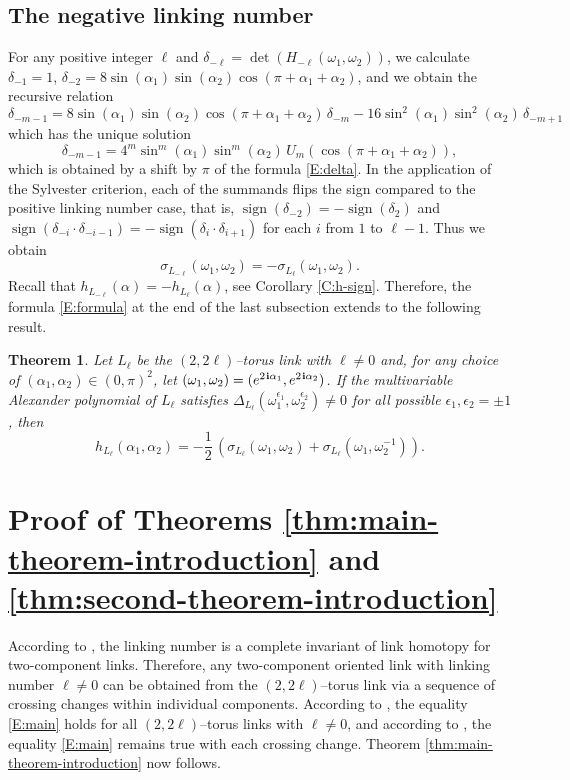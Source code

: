 \documentclass[11pt,reqno]{amsart}
\newtheorem{theorem}{Theorem}[section]
\theoremstyle{definition}
\renewcommand{\i}{\mspace{1.5mu}\mathbf i}
\newcommand{\sign}{\operatorname{sign}}
\begin{document}
\begin{sloppypar}
\subsection{The negative linking number}
For any positive integer $\ell$ and $\delta_{- \ell} = \det(H_{- \ell}(\omega_1, \omega_2))$, we calculate $\delta_{- 1} = 1$, $\delta_{- 2} = 8 \sin(\alpha_1) \sin(\alpha_2) \cos(\pi + \alpha_1 + \alpha_2)$, and we obtain the recursive relation
\[
\delta_{- m - 1} = 8 \sin(\alpha_1) \sin(\alpha_2) \cos(\pi + \alpha_1 + \alpha_2)\, \delta_{- m} - 16 \sin^2(\alpha_1) \sin^2(\alpha_2)\, \delta_{- m + 1}
\]
which has the unique solution
\[
\delta_{- m - 1} = 4^m \sin^m(\alpha_1) \sin^m(\alpha_2)\, U_m(\cos(\pi + \alpha_1 + \alpha_2)),
\]
which is obtained by a shift by $\pi$ of the formula \eqref{E:delta}. In the application of the Sylvester criterion, each of the summands flips the sign compared to the positive linking number case, that is, $\sign(\delta_{- 2}) = - \sign(\delta_2)$ and $\sign(\delta_{- i} \cdot \delta_{- i - 1}) = - \sign(\delta_i \cdot \delta_{i + 1})$ for each $i$ from $1$ to $\ell - 1$. Thus we obtain
\[
\sigma_{L_{- \ell}}(\omega_1, \omega_2) = - \sigma_{L_{\ell}}(\omega_1, \omega_2).
\]
Recall that $h_{L_{- \ell}}(\alpha) = - h_{L_{\ell}}(\alpha)$, see Corollary \ref{C:h-sign}. Therefore, the formula \eqref{E:formula} at the end of the last subsection extends to the following result. 
		
\begin{theorem}
Let $L_{\ell}$ be the $(2, 2\ell)$--torus link with $\ell \neq 0$ and, for any choice of $(\alpha_1, \alpha_2) \in (0, \pi)^2$, let $(\omega_1, \omega_2) = (e^{2 \i \alpha_1},e^{2 \i \alpha_2})$. If the multivariable Alexander polynomial of $L_{\ell}$ satisfies $\Delta_{L_{\ell}} (\omega_1^{\epsilon_1}, \omega_2^{\epsilon_2}) \ne 0$ for all possible $\epsilon_1, \epsilon_2 = \pm 1$, then
\[
h_{L_{\ell}}(\alpha_1, \alpha_2) = - \frac{1}{2}\, (\sigma_{L_{\ell}}(\omega_1, \omega_2) + \sigma_{L_{\ell}}(\omega_1, \omega_2^{- 1})).
\]
\end{theorem}

	
\section{Proof of Theorems \ref{thm:main-theorem-introduction} and \ref{thm:second-theorem-introduction}}\label{sec:seven}		
According to \cite{Milnor1}, the linking number is a complete invariant of link homotopy for two-component links. Therefore, any two-component oriented link with linking number $\ell \ne 0$ can be obtained from the $(2, 2 \ell)$--torus link via a sequence of crossing changes within individual components. According to , the equality \eqref{E:main} holds for all $(2, 2 \ell)$--torus links with $\ell \neq 0$, and according to , the equality \eqref{E:main} remains true with each crossing change. Theorem \ref{thm:main-theorem-introduction} now follows.


\end{sloppypar}
\end{document}
